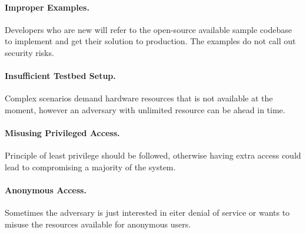 \paragraph{Improper Examples.} Developers who are new will refer to the open-source available sample codebase to implement and get their solution to production. The examples do not call out security risks.

\paragraph{Insufficient Testbed Setup.} Complex scenarios demand hardware resources that is not available at the moment, however an adversary with unlimited resource can be ahead in time.

\paragraph{Misusing Privileged Access.} Principle of least privilege should be followed, otherwise having extra access could lead to compromising a majority of the system.

\paragraph{Anonymous Access.} Sometimes the adversary is just interested in eiter denial of service or wants to misuse the resources available for anonymous users.